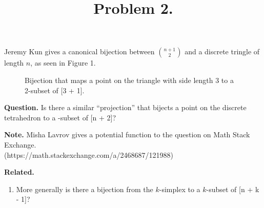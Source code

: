 \documentclass{article}
\newenvironment{question}{\begin{trivlist}\item[\textbf{Question.}]}{\end{trivlist}}
\newenvironment{note}{\begin{trivlist}\item[\textbf{Note.}]}{\end{trivlist}}
\newenvironment{related}{\begin{trivlist}\item[\textbf{Related.}]\end{trivlist}\begin{enumerate}}{\end{enumerate}}
\begin{document}
\title{Problem 2.}
\date{}
\author{}
\maketitle

Jeremy Kun gives a canonical bijection between $\binom{n + 1}{2}$ and a discrete
tringle of length $n$, as seen in Figure 1.
\begin{figure}[!h]
  \centering
  \caption{Bijection that maps a point on the triangle with side length 3 to a 2-subset of [3 + 1].}
\end{figure}

\begin{question}
  Is there a similar ``projection'' that bijects a point on the discrete
  tetrahedron to a -subset of [n + 2]?
\end{question}

\begin{note}
  Misha Lavrov gives a potential function to the question on Math Stack Exchange. \\
  (https://math.stackexchange.com/a/2468687/121988)
\end{note}

\begin{related}
  \item More generally is there a bijection from the $k$-simplex to a $k$-subset of [n + k - 1]?
\end{related}
\end{document}
